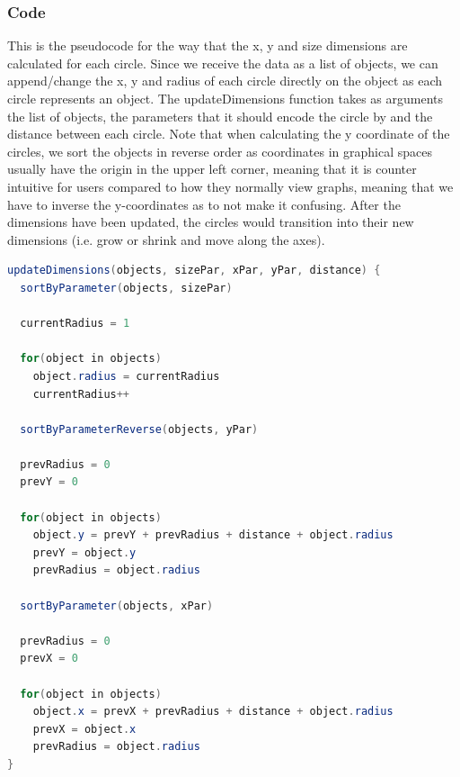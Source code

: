 \documentclass[Report.tex]{subfiles}
\begin{document}
\subsubsection{Code}
This is the pseudocode for the way that the x, y and size dimensions are calculated for each circle.
Since we receive the data as a list of objects, we can append/change the x, y and radius of each circle directly on the object as each circle represents an object. The updateDimensions function takes as arguments the list of objects, the parameters that it should encode the circle by and the distance between each circle. Note that when calculating the y coordinate of the circles, we sort the objects in reverse order as coordinates in graphical spaces usually have the origin in the upper left corner, meaning that it is counter intuitive for users compared to how they normally view graphs, meaning that we have to inverse the y-coordinates as to not make it confusing. After the dimensions have been updated, the circles would transition into their new dimensions (i.e. grow or shrink and move along the axes).

\begin{lstlisting}[language=java]
updateDimensions(objects, sizePar, xPar, yPar, distance) {
  sortByParameter(objects, sizePar)

  currentRadius = 1

  for(object in objects)
    object.radius = currentRadius
    currentRadius++

  sortByParameterReverse(objects, yPar)

  prevRadius = 0
  prevY = 0

  for(object in objects)
    object.y = prevY + prevRadius + distance + object.radius
    prevY = object.y
    prevRadius = object.radius

  sortByParameter(objects, xPar)

  prevRadius = 0
  prevX = 0

  for(object in objects)
    object.x = prevX + prevRadius + distance + object.radius
    prevX = object.x
    prevRadius = object.radius
}
\end{lstlisting}
\end{document}
